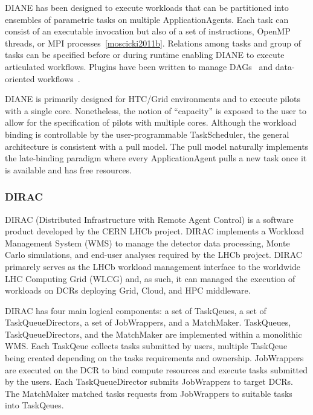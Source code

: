 \documentclass{sig-alternate}
\begin{document}
DIANE has been designed to execute workloads that can be partitioned into
ensembles of parametric tasks on multiple ApplicationAgents. Each task can
consist of an executable invocation but also of a set of instructions, OpenMP
threads, or MPI processes~\ref{moscicki2011b}. Relations among tasks and group
of tasks can be specified before or during runtime enabling DIANE to execute
articulated workflows. Plugins have been written to manage
DAGs~\cite{grzeslo2009} and data-oriented workflows~\cite{glatard2008}.

DIANE is primarily designed for HTC/Grid environments and to execute pilots with
a single core. Nonetheless, the notion of ``capacity'' is exposed to the user to
allow for the specification of pilots with multiple cores. Although the workload
binding is controllable by the user-programmable TaskScheduler, the general
architecture is consistent with a pull model. The pull model naturally
implements the late-binding paradigm where every ApplicationAgent pulls a new
task once it is available and has free resources.

%
\subsubsection{DIRAC}\label{sec:dirac}

DIRAC (Distributed Infrastructure with Remote Agent Control) is a software
product developed by the CERN LHCb project\cite{diracgrid2004}. DIRAC implements
a Workload Management System (WMS) to manage the detector data processing, Monte
Carlo simulations, and end-user analyses required by the LHCb project. DIRAC
primarely serves as the LHCb workload management interface to the worldwide LHC
Computing Grid (WLCG) and, as such, it can managed the execution of workloads on
DCRs deploying Grid, Cloud, and HPC middleware.

DIRAC has four main logical components: a set of TaskQeues, a set of
TaskQueueDirectors, a set of JobWrappers, and a MatchMaker. TaskQueues,
TaskQueueDirectors, and the MatchMaker are implemented within a monolithic WMS.
Each TaskQeue collects tasks submitted by users, multiple TaskQeue being created
depending on the tasks requirements and ownership. JobWrappers are executed on
the DCR to bind compute resources and execute tasks submitted by the users. Each
TaskQueueDirector submits JobWrappers to target DCRs. The MatchMaker matched
tasks requests from JobWrappers to suitable tasks into TaskQeues.
\end{document}
